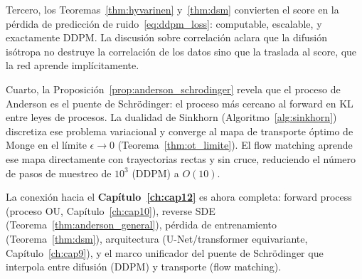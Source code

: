 Tercero, los Teoremas~\ref{thm:hyvarinen} y~\ref{thm:dsm} convierten el score
en la pérdida de predicción de ruido~\eqref{eq:ddpm_loss}: computable, escalable,
y exactamente DDPM. La discusión sobre correlación aclara que la difusión
isótropa no destruye la correlación de los datos sino que la traslada al score,
que la red aprende implícitamente.

Cuarto, la Proposición~\ref{prop:anderson_schrodinger} revela que el proceso de
Anderson es el puente de Schrödinger: el proceso más cercano al forward en KL
entre leyes de procesos. La dualidad de Sinkhorn (Algoritmo~\ref{alg:sinkhorn})
discretiza ese problema variacional y converge al mapa de transporte óptimo de
Monge en el límite $\epsilon\to 0$ (Teorema~\ref{thm:ot_limite}). El flow
matching aprende ese mapa directamente con trayectorias rectas y sin cruce,
reduciendo el número de pasos de muestreo de $10^3$ (DDPM) a $O(10)$.

La conexión hacia el \textbf{Capítulo~\ref{ch:cap12}} es ahora completa: forward process
(proceso OU, Capítulo~\ref{ch:cap10}), reverse SDE (Teorema~\ref{thm:anderson_general}),
pérdida de entrenamiento (Teorema~\ref{thm:dsm}), arquitectura (U-Net/transformer
equivariante, Capítulo~\ref{ch:cap9}), y el marco unificador del puente de Schrödinger que
interpola entre difusión (DDPM) y transporte (flow matching).

